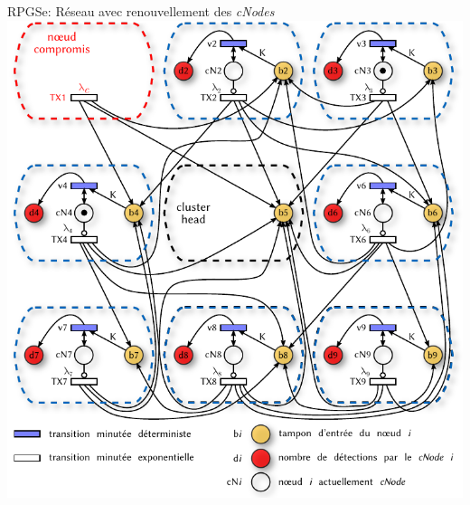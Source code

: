 \documentclass[aspectratio=43]{beamer} %
\newcommand\cns{\textit{cNodes}\xspace}
\begin{document}
\begin{frame}{RPGSe: Réseau avec renouvellement des \cns}
  \centering
  \includegraphics[height=.95\textheight]{Figs/RPSGe_network3x3_dynamic.pdf}
\end{frame}
\end{document}
